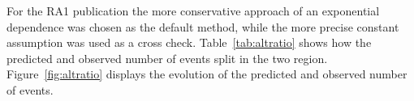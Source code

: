 For the RA1 publication the more conservative approach of an exponential dependence
was chosen as the default method, while the more precise constant assumption was used as a cross check.
Table~\ref{tab:altratio} shows how the predicted and observed number of events split in the two \scalht region. Figure~\ref{fig:altratio} displays the \scalht evolution of the predicted and observed number of events. 



